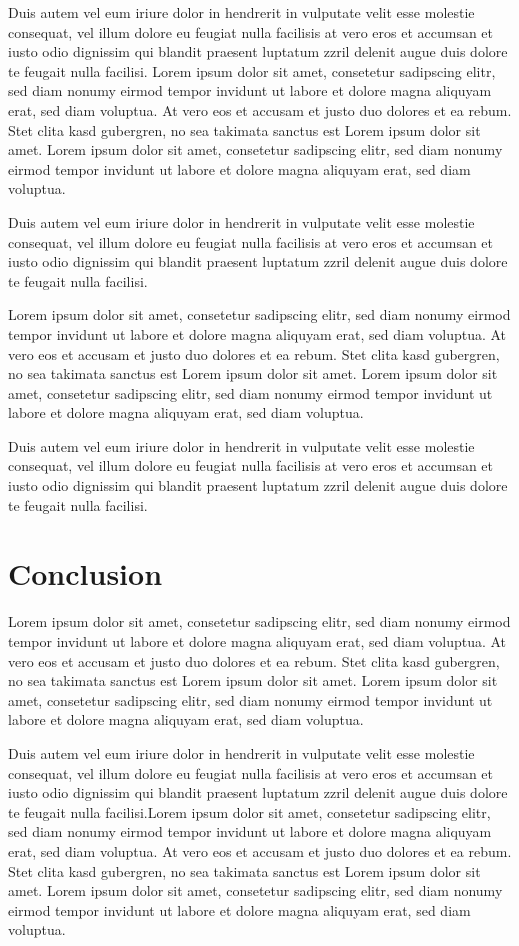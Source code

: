 Duis autem vel eum iriure dolor in hendrerit in vulputate velit esse molestie consequat, vel illum dolore eu feugiat nulla facilisis at vero eros et accumsan et iusto odio dignissim qui blandit praesent luptatum zzril delenit augue duis dolore te feugait nulla facilisi.
Lorem ipsum dolor sit amet, consetetur sadipscing elitr, sed diam nonumy eirmod tempor invidunt ut labore et dolore magna aliquyam erat, sed diam voluptua. At vero eos et accusam et justo duo dolores et ea rebum. Stet clita kasd gubergren, no sea takimata sanctus est Lorem ipsum dolor sit amet. Lorem ipsum dolor sit amet, consetetur sadipscing elitr, sed diam nonumy eirmod tempor invidunt ut labore et dolore magna aliquyam erat, sed diam voluptua.

Duis autem vel eum iriure dolor in hendrerit in vulputate velit esse molestie consequat, vel illum dolore eu feugiat nulla facilisis at vero eros et accumsan et iusto odio dignissim qui blandit praesent luptatum zzril delenit augue duis dolore te feugait nulla facilisi.

Lorem ipsum dolor sit amet, consetetur sadipscing elitr, sed diam nonumy eirmod tempor invidunt ut labore et dolore magna aliquyam erat, sed diam voluptua. At vero eos et accusam et justo duo dolores et ea rebum. Stet clita kasd gubergren, no sea takimata sanctus est Lorem ipsum dolor sit amet. Lorem ipsum dolor sit amet, consetetur sadipscing elitr, sed diam nonumy eirmod tempor invidunt ut labore et dolore magna aliquyam erat, sed diam voluptua.

Duis autem vel eum iriure dolor in hendrerit in vulputate velit esse molestie consequat, vel illum dolore eu feugiat nulla facilisis at vero eros et accumsan et iusto odio dignissim qui blandit praesent luptatum zzril delenit augue duis dolore te feugait nulla facilisi.

\section{Conclusion} \label{sec:Conclusion}
\nobreak
Lorem ipsum dolor sit amet, consetetur sadipscing elitr, sed diam nonumy eirmod tempor invidunt ut labore et dolore magna aliquyam erat, sed diam voluptua. At vero eos et accusam et justo duo dolores et ea rebum. Stet clita kasd gubergren, no sea takimata sanctus est Lorem ipsum dolor sit amet. Lorem ipsum dolor sit amet, consetetur sadipscing elitr, sed diam nonumy eirmod tempor invidunt ut labore et dolore magna aliquyam erat, sed diam voluptua.

Duis autem vel eum iriure dolor in hendrerit in vulputate velit esse molestie consequat, vel illum dolore eu feugiat nulla facilisis at vero eros et accumsan et iusto odio dignissim qui blandit praesent luptatum zzril delenit augue duis dolore te feugait nulla facilisi.Lorem ipsum dolor sit amet, consetetur sadipscing elitr, sed diam nonumy eirmod tempor invidunt ut labore et dolore magna aliquyam erat, sed diam voluptua. At vero eos et accusam et justo duo dolores et ea rebum. Stet clita kasd gubergren, no sea takimata sanctus est Lorem ipsum dolor sit amet. Lorem ipsum dolor sit amet, consetetur sadipscing elitr, sed diam nonumy eirmod tempor invidunt ut labore et dolore magna aliquyam erat, sed diam voluptua.

